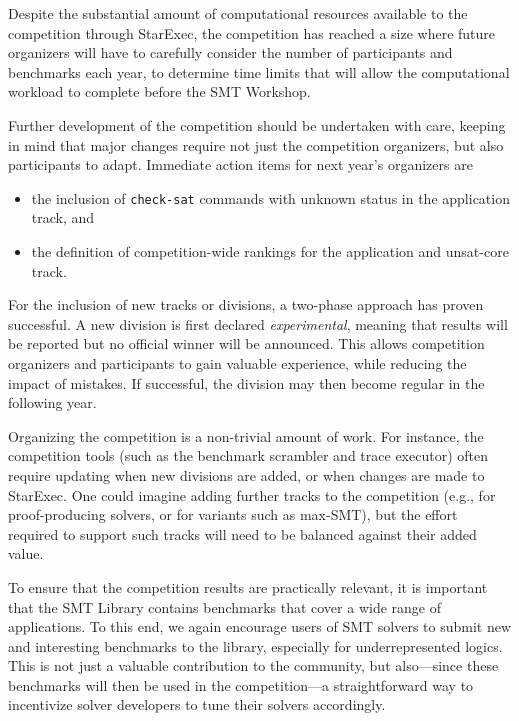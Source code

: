 \documentclass[twoside,11pt]{article}
\begin{document}
Despite the substantial amount of computational resources available to
the competition through StarExec, the competition has reached a size
where future organizers will have to carefully consider the number of
participants and benchmarks each year, to determine time limits that
will allow the computational workload to complete before the SMT
Workshop.

Further development of the competition should be undertaken with care,
keeping in mind that major changes require not just the competition
organizers, but also participants to adapt.  Immediate action items
for next year's organizers are
\begin{itemize}
\item the inclusion of {\tt check-sat} commands with unknown status in
  the application track, and
\item the definition of competition-wide rankings for the application
  and unsat-core track.
\end{itemize}

For the inclusion of new tracks or divisions, a two-phase approach has
proven successful.  A new division is first declared
\emph{experimental}, meaning that results will be reported but no
official winner will be announced.  This allows competition organizers
and participants to gain valuable experience, while reducing the
impact of mistakes.  If successful, the division may then become
regular in the following year.

Organizing the competition is a non-trivial amount of work.  For
instance, the competition tools (such as the benchmark scrambler and
trace executor) often require updating when new divisions are added,
or when changes are made to StarExec.  One could imagine adding
further tracks to the competition (e.g., for proof-producing solvers,
or for variants such as max-SMT), but the effort required to support
such tracks will need to be balanced against their added value.

To ensure that the competition results are practically relevant, it is
important that the SMT Library contains benchmarks that cover a wide
range of applications.  To this end, we again encourage users of SMT
solvers to submit new and interesting benchmarks to the library,
especially for underrepresented logics.  This is not just a valuable
contribution to the community, but also---since these benchmarks will
then be used in the competition---a straightforward way to incentivize
solver developers to tune their solvers accordingly.
\end{document}
